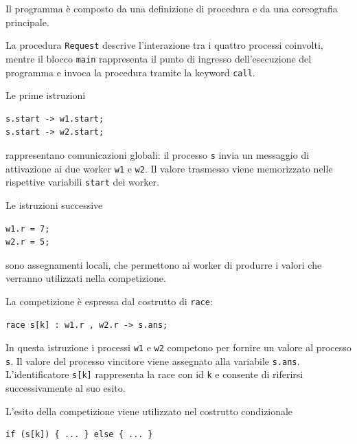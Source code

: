Il programma è composto da una definizione di procedura e da una coreografia principale.

La procedura \texttt{Request} descrive l’interazione tra i quattro processi coinvolti, mentre il blocco \texttt{main} rappresenta il punto di ingresso dell’esecuzione del programma e invoca la procedura tramite la keyword \texttt{call}.

Le prime istruzioni

\begin{tcolorbox}[colback=white,colframe=black!35,boxrule=0.4pt]
\begin{lstlisting}
s.start -> w1.start;
s.start -> w2.start;
\end{lstlisting}
\end{tcolorbox}

rappresentano comunicazioni globali: il processo \texttt{s} invia un messaggio di attivazione ai due worker \texttt{w1} e \texttt{w2}. Il valore trasmesso viene memorizzato nelle rispettive variabili \texttt{start} dei worker.

Le istruzioni successive

\begin{tcolorbox}[colback=white,colframe=black!35,boxrule=0.4pt]
\begin{lstlisting}
w1.r = 7;
w2.r = 5;
\end{lstlisting}
\end{tcolorbox}

sono assegnamenti locali, che permettono ai worker di produrre i valori che verranno utilizzati nella competizione.

La competizione è espressa dal costrutto di \texttt{race}:

\begin{tcolorbox}[colback=white,colframe=black!35,boxrule=0.4pt]
\begin{lstlisting}
race s[k] : w1.r , w2.r -> s.ans;
\end{lstlisting}
\end{tcolorbox}

In questa istruzione i processi \texttt{w1} e \texttt{w2} competono per fornire un valore al processo \texttt{s}. Il valore del processo vincitore viene assegnato alla variabile \texttt{s.ans}. L’identificatore \texttt{s[k]} rappresenta la race con id \texttt{k} e consente di riferirsi successivamente al suo esito.

L’esito della competizione viene utilizzato nel costrutto condizionale

\begin{tcolorbox}[colback=white,colframe=black!35,boxrule=0.4pt]
\begin{lstlisting}
if (s[k]) { ... } else { ... }
\end{lstlisting}
\end{tcolorbox}

